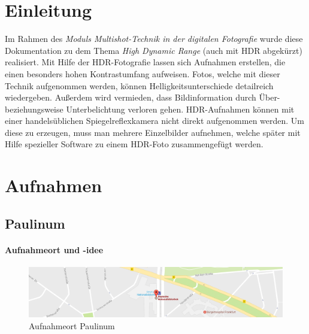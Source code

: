 \documentclass[liststotoc,bibtotoc,fontsize=14pt,]{scrreprt}
\begin{document}
	\chapter{Einleitung}
	\label{ch:einleitung}
	Im Rahmen des \textit{Moduls Multishot-Technik in der digitalen Fotografie} wurde diese Dokumentation zu dem Thema \textit{High Dynamic Range} (auch mit HDR abgekürzt) realisiert. Mit Hilfe der HDR-Fotografie lassen sich Aufnahmen erstellen, die einen besonders hohen Kontrastumfang aufweisen. Fotos, welche mit dieser Technik aufgenommen werden, können Helligkeitsunterschiede detailreich wiedergeben. Außerdem wird vermieden, dass Bildinformation durch Über- beziehungsweise Unterbelichtung verloren gehen. HDR-Aufnahmen können mit  einer handelsüblichen Spiegelreflexkamera nicht direkt aufgenommen werden. Um diese zu erzeugen, muss man mehrere Einzelbilder aufnehmen, welche später mit Hilfe spezieller Software zu einem HDR-Foto zusammengefügt werden.
	
			
	\chapter{Aufnahmen}
	\label{ch:aufnahmen}
	
	\section{Paulinum }
	\label{sec:spinnerei}

	\subsubsection{Aufnahmeort und -idee}

		\begin{figure}[H]
			\includegraphics[width=\linewidth]{img/places/bibo_map.jpg}
			\caption{Aufnahmeort Paulinum}
			\label{img:paulinum_map}
		\end{figure}
\end{document}

